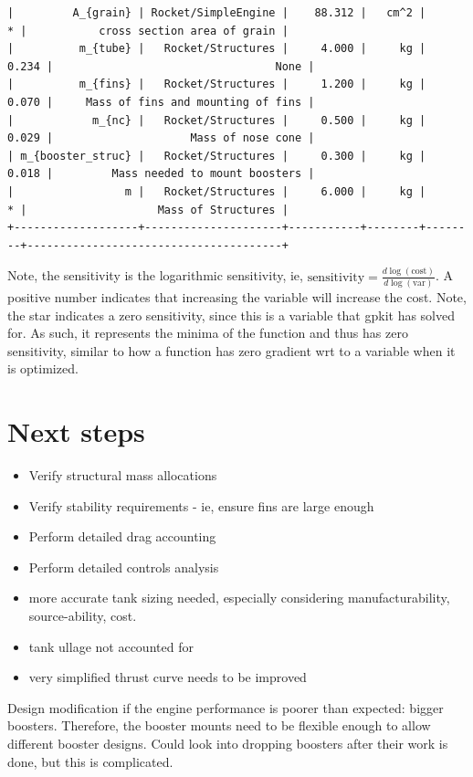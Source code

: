 \documentclass[12pt]{article}
\begin{document}
\begin{landscape}
\begin{verbatim}
|         A_{grain} | Rocket/SimpleEngine |    88.312 |   cm^2 |      * |           cross section area of grain |
|          m_{tube} |   Rocket/Structures |     4.000 |     kg |  0.234 |                                  None |
|          m_{fins} |   Rocket/Structures |     1.200 |     kg |  0.070 |     Mass of fins and mounting of fins |
|            m_{nc} |   Rocket/Structures |     0.500 |     kg |  0.029 |                     Mass of nose cone |
| m_{booster_struc} |   Rocket/Structures |     0.300 |     kg |  0.018 |         Mass needed to mount boosters |
|                 m |   Rocket/Structures |     6.000 |     kg |      * |                    Mass of Structures |
+-------------------+---------------------+-----------+--------+--------+---------------------------------------+
\end{verbatim}

Note, the sensitivity is the logarithmic sensitivity, ie, $\text{sensitivity} = \frac{d \log(\text{cost})}{d\log(\text{var})}$. A positive number indicates that increasing the variable will increase the cost. Note, the star indicates a zero sensitivity, since this is a variable that gpkit has solved for. As such, it represents the minima of the function and thus has zero sensitivity, similar to how a function has zero gradient wrt to a variable when it is optimized. 

\end{landscape}


\section{Next steps}
\begin{itemize}
\item Verify structural mass allocations
\item Verify stability requirements - ie, ensure fins are large enough
\item Perform detailed drag accounting
\item Perform detailed controls analysis
\item more accurate tank sizing needed, especially considering manufacturability, source-ability, cost.
\item tank ullage not accounted for
\item very simplified thrust curve needs to be improved
\end{itemize}

Design modification if the engine performance is poorer than expected: bigger boosters. Therefore, the booster mounts need to be flexible enough to allow different booster designs. Could look into dropping boosters after their work is done, but this is complicated. 
\end{document}
